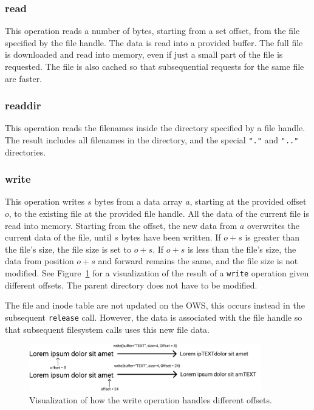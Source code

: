 \subsubsection{read}
This operation reads a number of bytes, starting from a set offset, from the file specified by the file handle. The data is read into a provided buffer. The full file is downloaded and read into memory, even if just a small part of the file is requested. The file is also cached so that subsequential requests for the same file are faster. 

\subsubsection{readdir}
This operation reads the filenames inside the directory specified by a file handle. The result includes all filenames in the directory, and the special \texttt{"."} and \texttt{".."} directories.

\subsubsection{write}
This operation writes $s$ bytes from a data array $a$, starting at the provided offset $o$, to the existing file at the provided file handle. All the data of the current file is read into memory. Starting from the offset, the new data from $a$ overwrites the current data of the file, until $s$ bytes have been written. If $o + s$ is greater than the file's size, the file size is set to $o + s$. If $o + s$ is less than the file's size, the data from position $o + s$ and forward remains the same, and the file size is not modified. See Figure~\ref{fig:write_flow} for a visualization of the result of a \texttt{write} operation given different offsets. The parent directory does not have to be modified. 

The file and inode table are not updated on the \gls{OWS}, this occurs instead in the subsequent \texttt{release} call. However, the data is associated with the file handle so that subsequent filesystem calls uses this new file data.

\begin{figure}[!ht]
	\begin{center}
	  \includegraphics[width=0.9\textwidth]{figures/write_flow.png}
	\end{center}
	\caption{Visualization of how the write operation handles different offsets.}
	\label{fig:write_flow}
\end{figure}

